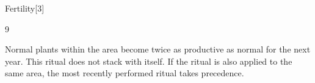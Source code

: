 \begin{spellsection}{Fertility}[3]

\begin{spellcontent}

\begin{spelltargetinginfo}


 9
\end{spelltargetinginfo}


\begin{spelleffects}



\spelleffect
Normal plants within the area become twice as productive as normal for the next year.
This ritual does not stack with itself.
If the  ritual is also applied to the same area, the most recently performed ritual takes precedence.








\end{spelleffects}

\end{spellcontent}
\begin{spellfooter}


\end{spellfooter}
\begin{spellsubcontent}


\end{spellsubcontent}
\end{spellsection}


